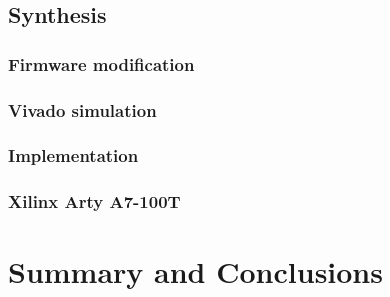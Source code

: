 \documentclass[a4paper,8pt]{report}
\begin{document}




\section{Synthesis}
\subsection{Firmware modification}


\subsection{Vivado simulation}                                     

\subsection{Implementation}

\subsection{Xilinx Arty A7-100T}

\chapter{Summary and Conclusions} 




\appendix
\singlespacing

 
%  

\end{document}
